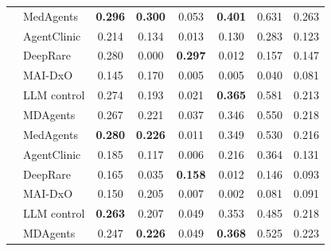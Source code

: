 \begin{table}[hpbt]
\begin{tabular}{@{}llcccccc@{}}
 & MedAgents & \textbf{0.296} & \textbf{0.300} & 0.053 & \textbf{0.401} & 0.631 & 0.263 \\
 & AgentClinic & 0.214 & 0.134 & 0.013 & 0.130 & 0.283 & 0.123 \\
 & DeepRare & 0.280 & 0.000 & \textbf{0.297} & 0.012 & 0.157 & 0.147 \\
 & MAI-DxO & 0.145 & 0.170 & 0.005 & 0.005 & 0.040 & 0.081 \\
\midrule
{} & LLM control & 0.274 & 0.193 & 0.021 & \textbf{0.365} & 0.581 & 0.213 \\
 & MDAgents & 0.267 & 0.221 & 0.037 & 0.346 & 0.550 & 0.218 \\
 & MedAgents & \textbf{0.280} & \textbf{0.226} & 0.011 & 0.349 & 0.530 & 0.216 \\
 & AgentClinic & 0.185 & 0.117 & 0.006 & 0.216 & 0.364 & 0.131 \\
 & DeepRare & 0.165 & 0.035 & \textbf{0.158} & 0.012 & 0.146 & 0.093 \\
 & MAI-DxO & 0.150 & 0.205 & 0.007 & 0.002 & 0.081 & 0.091 \\
\midrule
{} & LLM control & \textbf{0.263} & 0.207 & 0.049 & 0.353 & 0.485 & 0.218 \\
 & MDAgents & 0.247 & \textbf{0.226} & 0.049 & \textbf{0.368} & 0.525 & 0.223 \\

\end{tabular}
\end{table}
